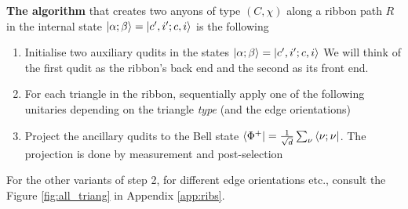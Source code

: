 \documentclass[two column]{article}
\newcommand{\caro}[1]{\textcolor{red}{[#1]}}
\begin{document}



\textbf{The algorithm} that creates two anyons of type $(C,\chi)$ along a ribbon path $R$ in the internal state $\ket{\alpha; \beta} = \ket{c', i'; c, i}$ is the following
\begin{enumerate}
    \item Initialise two auxiliary qudits in the states $\ket{\alpha; \beta} = \ket{c', i'; c, i}$  We will think of the first qudit as the ribbon's back end and the second as its front end.
    \item For each triangle in the ribbon, sequentially apply one of the following unitaries depending on the triangle \textit{type} (and the edge orientations) 
    \item Project the ancillary qudits to the Bell state $\bra{\Phi^+} = \frac{1}{\sqrt{d}}\sum_\nu \bra{\nu; \nu}$. The projection is done by measurement and post-selection
\end{enumerate}
For the other variants of step 2, for different edge orientations etc., consult the Figure \ref{fig:all_triang} in Appendix \ref{app:ribs}. 
\end{document}
